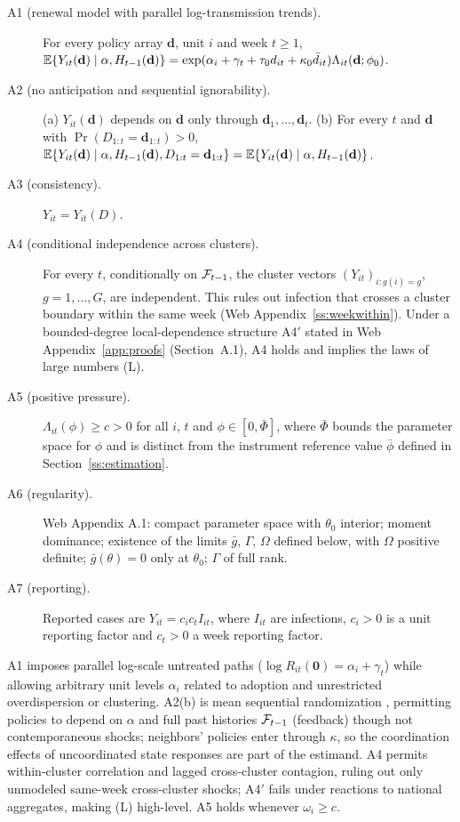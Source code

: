 \begin{description}
\item[A1 (renewal model with parallel log-transmission trends).] For every policy array
$\mathbf d$, unit $i$ and week $t\ge 1$,
$\mathbb{E}\{Y_{it}(\mathbf d)\mid \alpha,H_{t-1}(\mathbf d)\}=\exp(\alpha_i+\gamma_{t}+\tau_0 d_{it}+\kappa_0\bar d_{it})\Lambda_{it}(\mathbf d;\phi_0)$.
\item[A2 (no anticipation and sequential ignorability).] (a) $Y_{it}(\mathbf d)$ depends on
$\mathbf d$ only through $\mathbf d_1,\dots,\mathbf d_t$. (b) For every $t$ and $\mathbf d$ with
$\Pr(D_{1:t}=\mathbf d_{1:t})>0$,
$\mathbb{E}\{Y_{it}(\mathbf d)\mid\alpha,H_{t-1}(\mathbf d),D_{1:t}=\mathbf d_{1:t}\}=\mathbb{E}\{Y_{it}(\mathbf d)\mid\alpha,H_{t-1}(\mathbf d)\}$.
\item[A3 (consistency).] $Y_{it}=Y_{it}(D)$.
\item[A4 (conditional independence across clusters).] For every $t$, conditionally on $\mathcal{F}_{t-1}$,
the cluster vectors $(Y_{it})_{i:g(i)=g}$, $g=1,\dots,G$, are independent. This rules out
infection that crosses a cluster boundary within the same week (Web Appendix~\ref{ss:weekwithin}).
Under a bounded-degree local-dependence structure A4$'$ stated in Web Appendix~\ref{app:proofs}
(Section~A.1), A4 holds and implies the laws of large numbers (L).
\item[A5 (positive pressure).] $\Lambda_{it}(\phi)\ge c>0$ for all $i$, $t$ and
$\phi\in[0,\bar\Phi]$, where $\bar\Phi$ bounds the parameter space for $\phi$ and is distinct from
the instrument reference value $\bar\phi$ defined in Section~\ref{ss:estimation}.
\item[A6 (regularity).] Web Appendix A.1: compact parameter space with $\theta_0$ interior;
moment dominance; existence of the limits $\bar g$, $\Gamma$, $\Omega$ defined below, with
$\Omega$ positive definite; $\bar g(\theta)=0$ only at $\theta_0$; $\Gamma$ of full rank.
\item[A7 (reporting).] Reported cases are $Y_{it}=c_ic_tI_{it}$, where $I_{it}$ are infections,
$c_i>0$ is a unit reporting factor and $c_t>0$ a week reporting factor.
\end{description}

A1 imposes parallel log-scale untreated paths ($\log R_{it}(\mathbf 0)=\alpha_i+\gamma_t$) while allowing
arbitrary unit levels $\alpha_i$ related to adoption and unrestricted overdispersion or clustering.
A2(b) is mean sequential randomization \citep{robins2000msm,blackwell2018make}, permitting policies
to depend on $\alpha$ and full past histories $\mathcal{F}_{t-1}$ (feedback) though not contemporaneous shocks;
neighbors' policies enter through $\kappa$, so the coordination effects of uncoordinated state
responses \citep{holtz2020interdependence} are part of the estimand. A4 permits
within-cluster correlation and lagged cross-cluster contagion, ruling out only unmodeled same-week
cross-cluster shocks; A4$'$ fails under reactions to national aggregates, making (L) high-level.
A5 holds whenever $\omega_i\ge c$.


